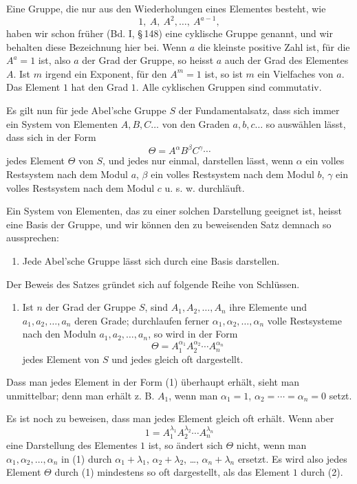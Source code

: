 \documentclass[11pt]{article}
\begin{document}
Eine Gruppe, die nur aus den Wiederholungen eines Elementes besteht, wie
\[
1,\ A,\ A^2,\ldots,\ A^{a-1},
\]
haben wir schon früher (Bd. I, \S\,148) eine cyklische Gruppe genannt, und wir behalten diese Bezeichnung hier bei. Wenn $a$ die kleinste positive Zahl ist, für die $A^a=1$ ist, also $a$ der Grad der Gruppe, so heisst $a$ auch der Grad des Elementes $A$. Ist $m$ irgend ein Exponent, für den $A^m=1$ ist, so ist $m$ ein Vielfaches von $a$. Das Element $1$ hat den Grad $1$. Alle cyklischen Gruppen sind commutativ.

Es gilt nun für jede Abel'sche Gruppe $S$ der Fundamentalsatz, dass sich immer ein System von Elementen $A,B,C\ldots$ von den Graden $a,b,c\ldots$ so auswählen lässt, dass sich in der Form
\[
\Theta=A^\alpha B^\beta C^\gamma\cdots
\]
jedes Element $\Theta$ von $S$, und jedes nur einmal, darstellen lässt, wenn $\alpha$ ein volles Restsystem nach dem Modul $a$, $\beta$ ein volles Restsystem nach dem Modul $b$, $\gamma$ ein volles Restsystem nach dem Modul $c$ u. s. w. durchläuft.

Ein System von Elementen, das zu einer solchen Darstellung geeignet ist, heisst eine Basis der Gruppe, und wir können den zu beweisenden Satz demnach so aussprechen:

\begin{enumerate}[label=\Roman*.]
\item Jede Abel'sche Gruppe lässt sich durch eine Basis darstellen.
\end{enumerate}

Der Beweis des Satzes gründet sich auf folgende Reihe von Schlüssen.

\begin{enumerate}[label=\arabic*.]
\item Ist $n$ der Grad der Gruppe $S$, sind $A_1,A_2,\ldots,A_n$ ihre Elemente und $a_1,a_2,\ldots,a_n$ deren Grade; durchlaufen ferner $\alpha_1,\alpha_2,\ldots,\alpha_n$ volle Restsysteme nach den Moduln $a_1,a_2,\ldots,a_n$, so wird in der Form
\begin{equation}
\Theta=A_1^{\alpha_1}A_2^{\alpha_2}\cdots A_n^{\alpha_n}
\tag{1}
\end{equation}
jedes Element von $S$ und jedes gleich oft dargestellt.
\end{enumerate}

Dass man jedes Element in der Form (1) überhaupt erhält, sieht man unmittelbar; denn man erhält z. B. $A_1$, wenn man $\alpha_1=1$, $\alpha_2=\cdots=\alpha_n=0$ setzt.

Es ist noch zu beweisen, dass man jedes Element gleich oft erhält. Wenn aber
\begin{equation}
1=A_1^{\lambda_1}A_2^{\lambda_2}\cdots A_n^{\lambda_n}
\tag{2}
\end{equation}
eine Darstellung des Elementes $1$ ist, so ändert sich $\Theta$ nicht, wenn man $\alpha_1,\alpha_2,\ldots,\alpha_n$ in (1) durch $\alpha_1+\lambda_1$, $\alpha_2+\lambda_2$, \ldots, $\alpha_n+\lambda_n$ ersetzt. Es wird also jedes Element $\Theta$ durch (1) mindestens so oft dargestellt, als das Element $1$ durch (2).
\end{document}
